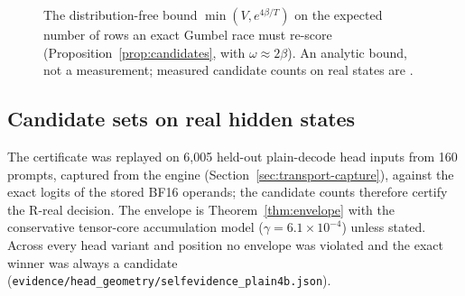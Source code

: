 \begin{figure}[tbp]
\centering
{}
\caption{The distribution-free bound $\min(V,e^{4\beta/T})$ on the expected number of rows an exact Gumbel race must re-score (Proposition~\ref{prop:candidates}, with $\omega\approx2\beta$). An analytic bound, not a measurement; measured candidate counts on real states are .}
\label{fig:candidates}
\end{figure}

\subsection{Candidate sets on real hidden states}\label{sec:geometry-selfevidence}
The certificate was replayed on 6,005 held-out plain-decode head inputs from 160 prompts, captured from the engine (Section~\ref{sec:transport-capture}), against the exact logits of the stored BF16 operands; the candidate counts therefore certify the R-real decision. The envelope is Theorem~\ref{thm:envelope} with the conservative tensor-core accumulation model ($\gamma=6.1\times10^{-4}$) unless stated. Across every head variant and position no envelope was violated and the exact winner was always a candidate (\nolinkurl{evidence/head_geometry/selfevidence_plain4b.json}).

